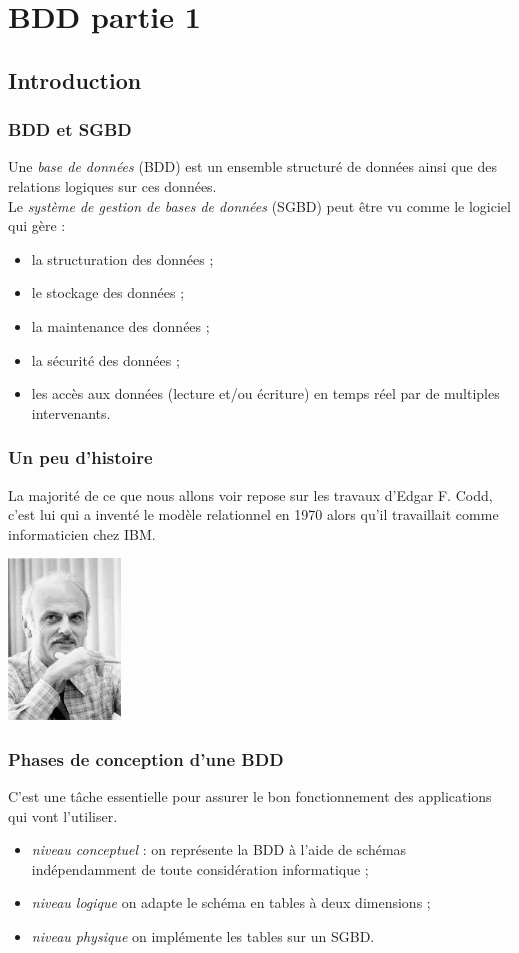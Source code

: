 \chapter{BDD partie 1}
\section{Introduction}
\subsection{BDD et SGBD}
Une \textit{base de données} (BDD) est un ensemble structuré de données ainsi que des relations logiques sur ces données.\\

Le \textit{système de gestion de bases de données} (SGBD) peut être vu comme le logiciel qui gère :
\begin{itemize}
    \item	la structuration des données ;
    \item	le stockage des données ;
    \item 	la maintenance des données ;
    \item 	la sécurité des données ;
    \item 	les accès aux données (lecture et/ou écriture) en temps réel par de multiples intervenants.
\end{itemize}


\subsection{Un peu d'histoire}
La majorité de ce que nous allons voir repose sur les travaux d'Edgar F. Codd, c'est lui qui a inventé le modèle relationnel en 1970 alors qu'il travaillait comme informaticien chez IBM.
\begin{center}
    \includegraphics[width=3cm]{img/codd}
\end{center}


\subsection{Phases de conception d'une BDD}
C'est une tâche essentielle pour assurer le bon fonctionnement des applications qui vont l'utiliser.
\begin{itemize}
    \item	\textit{niveau conceptuel} : on représente la BDD à l'aide de schémas indépendamment de toute considération informatique ;
    \item	\textit{niveau logique} on adapte le schéma en tables à deux dimensions ;
    \item	\textit{niveau physique} on implémente les tables sur un SGBD.
\end{itemize}

